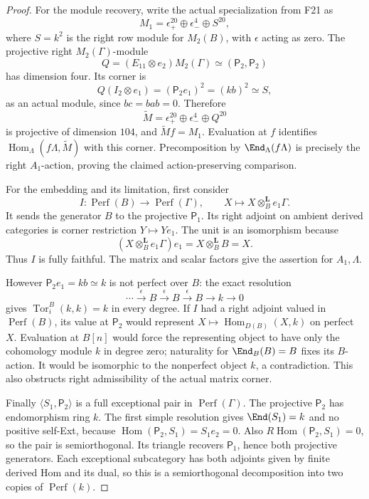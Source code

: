 \documentclass[11pt,a4paper]{article}
\newcommand{\fid}[1]{\textsf{#1}}\newcommand{\gate}[1]{\textsf{#1}}
\theoremstyle{named}\newtheorem{finding}{Finding}[section]
\theoremstyle{definition}\newtheorem{definition}[finding]{Definition}
\theoremstyle{remark}\newtheorem{remark}[finding]{Remark}
\begin{document}
\begin{proof}
For the module recovery, write the actual specialization from
\fid{F21} as
\[
 M_1=\epsilon_+^{20}\oplus\epsilon_-^4\oplus S^{20},
\]
where $S=k^2$ is the right row module for $M_2(B)$, with
$\epsilon$ acting as zero. The projective right $M_2(\Gamma)$-module
\[
 Q=(E_{11}\otimes e_2)M_2(\Gamma)
     \simeq(\mathsf P_2,\mathsf P_2)
\]
has dimension four. Its corner is
\[
 Q(I_2\otimes e_1)=(\mathsf P_2e_1)^2
       =(kb)^2\simeq S,
\]
as an actual module, since $bc=bab=0$. Therefore
\[
 \widetilde M=\epsilon_+^{20}\oplus\epsilon_-^4\oplus Q^{20}
\]
is projective of dimension $104$, and
$\widetilde M f=M_1$. Evaluation at $f$ identifies
$\operatorname{Hom}_\Lambda(f\Lambda,\widetilde M)$ with this
corner. Precomposition by $\End_\Lambda(f\Lambda)$ is precisely
the right $A_1$-action, proving the claimed action-preserving
comparison.

For the embedding and its limitation, first consider
\[
 I:\operatorname{Perf}(B)\longrightarrow\operatorname{Perf}(\Gamma),
 \qquad X\longmapsto X\otimes_B^{\mathbf L}e_1\Gamma.
\]
It sends the generator $B$ to the projective $\mathsf P_1$.
Its right adjoint on ambient derived categories is corner
restriction $Y\mapsto Ye_1$. The unit is an isomorphism because
\[
 (X\otimes_B^{\mathbf L}e_1\Gamma)e_1
       =X\otimes_B^{\mathbf L}B=X.
\]
Thus $I$ is fully faithful. The matrix and scalar factors give
the assertion for $A_1,\Lambda$.

However $\mathsf P_2e_1=kb\simeq k$ is not perfect over $B$:
the exact resolution
\[
 \cdots\xrightarrow{\epsilon}B\xrightarrow{\epsilon}B
   \xrightarrow{\epsilon}B\longrightarrow k\longrightarrow0
\]
gives $\operatorname{Tor}^B_i(k,k)=k$ in every degree.
If $I$ had a right adjoint valued in $\operatorname{Perf}(B)$,
its value at $\mathsf P_2$ would represent
$X\mapsto\operatorname{Hom}_{D(B)}(X,k)$ on perfect $X$.
Evaluation at $B[n]$ would force the representing object to
have only the cohomology module $k$ in degree zero; naturality
for $\End_B(B)=B$ fixes its $B$-action. It would be isomorphic
to the nonperfect object $k$, a contradiction. This also
obstructs right admissibility of the actual matrix corner.

Finally $\langle S_1,\mathsf P_2\rangle$ is a full exceptional
pair in $\operatorname{Perf}(\Gamma)$.
The projective $\mathsf P_2$ has endomorphism ring $k$.
The first simple resolution gives
$\End(S_1)=k$ and no positive self-Ext, because
$\operatorname{Hom}(\mathsf P_2,S_1)=S_1e_2=0$.
Also $R\operatorname{Hom}(\mathsf P_2,S_1)=0$, so the pair
is semiorthogonal. Its triangle recovers $\mathsf P_1$, hence
both projective generators. Each exceptional subcategory has
both adjoints given by finite derived Hom and its dual, so this
is a semiorthogonal decomposition into two copies of
$\operatorname{Perf}(k)$.


\end{proof}
\end{document}
